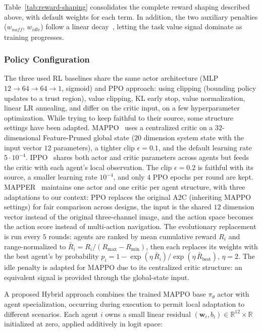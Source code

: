 \documentclass[sigconf]{acmart}
\begin{document}
Table~\ref{tab:reward-shaping} consolidates the complete reward shaping described above, with default weights for each term. In addition, the two auxiliary penalties ($w_{\mathit{naff}}$, $w_{\mathit{idle}}$) follow a linear
decay~\cite{andrychowicz2021}, letting the task value signal dominate as
training progresses.

\subsubsection{Policy Configuration}

The three used RL baselines share the same actor architecture (MLP $12{\to}64{\to}64{\to}1$, sigmoid) and PPO approach: using clipping (bounding policy updates to a trust region), value clipping, KL early stop, value normalization, linear LR annealing, and differ on the critic input, on a few hyperparameter optimization. While trying to keep faithful to their source, some structure settings have been adapted. MAPPO~\cite{yu2022} uses a centralized critic on a $32$-dimensional Feature-Pruned global state ($20$ dimension system state with the input vector $12$ parameters), a tighter clip $\epsilon = 0.1$, and the default learning rate $5 \cdot 10^{-4}$. IPPO~\cite{dewitt2020} shares both actor and critic parameters across agents but feeds the critic with each agent's local observation. The clip $\epsilon = 0.2$ is faithful with its source, a smaller learning rate $10^{-4}$, and only $4$ PPO epochs per round are kept. MAPPER~\cite{liu2020} maintains one actor and one critic per agent structure, with three adaptations to our context: PPO replaces the original A2C (inheriting MAPPO settings) for fair comparison across designs, the input is the shared $12$ dimension vector instead of the original three-channel image, and the action space becomes the action score instead of multi-action navigation. The evolutionary replacement is run every $5$ rounds: agents are ranked by mean cumulative reward $R_i$ and range-normalized to $\bar{R}_i = R_i / (R_{\max} - R_{\min})$, then each replaces its weights with the best agent's by probability $p_i = 1 - \exp(\eta\,\bar{R}_i)/\exp(\eta\,\bar{R}_{\mathrm{best}})$, $\eta = 2$. The idle penalty is adapted for MAPPO due to its centralized critic structure: an equivalent signal is provided through the global-state input.

A proposed Hybrid approach combines the trained MAPPO base $\pi_\theta$ actor with agent specialization, occurring during execution to permit local adaptation to different scenarios. Each agent $i$ owns a small linear residual $(\mathbf{w}_i, b_i) \in \mathbb{R}^{12} \times \mathbb{R}$ initialized at zero, applied additively in logit space:
\end{document}
